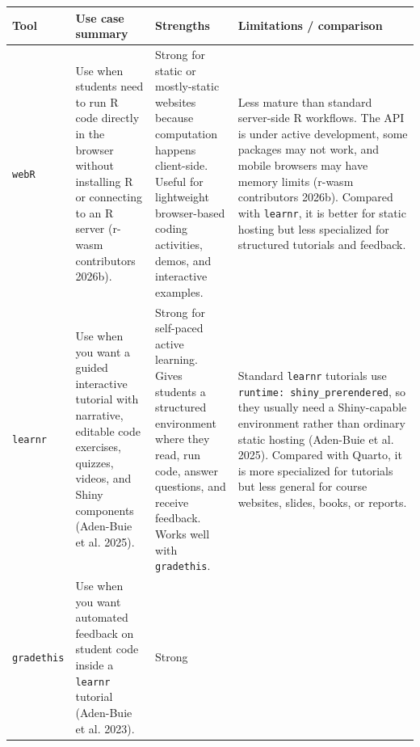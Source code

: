 \documentclass[
  letterpaper,
  DIV=11,
  numbers=noendperiod]{scrartcl}
\begin{document}
\begin{longtable}[]{@{}
  >{\raggedright\arraybackslash}p{}
  >{\raggedright\arraybackslash}p{}
  >{\raggedright\arraybackslash}p{}
  >{\raggedright\arraybackslash}p{}@{}}
\toprule\noalign{}
\begin{minipage}[b]{\linewidth}\raggedright
Tool
\end{minipage} & \begin{minipage}[b]{\linewidth}\raggedright
Use case summary
\end{minipage} & \begin{minipage}[b]{\linewidth}\raggedright
Strengths
\end{minipage} & \begin{minipage}[b]{\linewidth}\raggedright
Limitations / comparison
\end{minipage} \\
\midrule\noalign{}
\endhead
\bottomrule\noalign{}
\endlastfoot
\texttt{webR} & Use when students need to run R code directly in the
browser without installing R or connecting to an R server (r-wasm
contributors 2026b). & Strong for static or mostly-static websites
because computation happens client-side. Useful for lightweight
browser-based coding activities, demos, and interactive examples. & Less
mature than standard server-side R workflows. The API is under active
development, some packages may not work, and mobile browsers may have
memory limits (r-wasm contributors 2026b). Compared with
\texttt{learnr}, it is better for static hosting but less specialized
for structured tutorials and feedback. \\
\texttt{learnr} & Use when you want a guided interactive tutorial with
narrative, editable code exercises, quizzes, videos, and Shiny
components (Aden-Buie et al. 2025). & Strong for self-paced active
learning. Gives students a structured environment where they read, run
code, answer questions, and receive feedback. Works well with
\texttt{gradethis}. & Standard \texttt{learnr} tutorials use
\texttt{runtime:\ shiny\_prerendered}, so they usually need a
Shiny-capable environment rather than ordinary static hosting (Aden-Buie
et al. 2025). Compared with Quarto, it is more specialized for tutorials
but less general for course websites, slides, books, or reports. \\
\texttt{gradethis} & Use when you want automated feedback on student
code inside a \texttt{learnr} tutorial (Aden-Buie et al. 2023). & Strong

\end{longtable}
\end{document}
